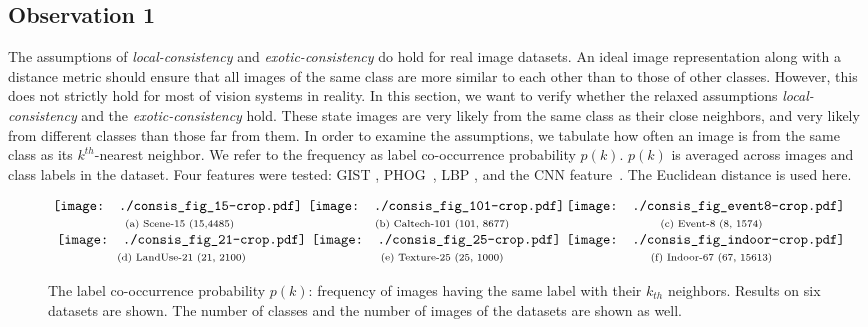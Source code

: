 \documentclass[preprint,12pt,3p]{elsarticle}
\begin{document}
\subsection{Observation 1}
\label{sec:mov1}
The assumptions of \emph{local-consistency} and
\emph{exotic-consist\-ency} do hold for real image datasets.  An
ideal image representation along with a distance metric should ensure
that all images of the same class are more similar to each other
than to those of other classes. However, this does not strictly hold for
most of vision systems in reality. In this section, we want to verify
whether the relaxed assumptions 
\emph{local-consistency} and the \emph{exotic-consistency} hold. 
These state images are very likely from the same class as their close
neighbors, and very likely from different classes than those far from them. 
In order to examine the assumptions, we tabulate how often an
image is from the same class as its $k^{th}$-nearest neighbor.  We
refer to the frequency as label co-occurrence probability $p(k)$.
$p(k)$ is averaged across images and class labels in the dataset. Four
features were tested: GIST \citep{gist}, PHOG~\citep{Bosch:iccv07},
LBP \citep{Ojala02}, and the CNN feature~\citep{deep:bmvc14}. 
The Euclidean distance is used here.

\begin{figure*}[ht]
$ \begin{array}{cccc} \hspace{-2mm}
\texttt{[image: ./consis\_fig\_15-crop.pdf]} & \hspace{-3mm}
\texttt{[image: ./consis\_fig\_101-crop.pdf]} & \hspace{-3mm} 
\texttt{[image: ./consis\_fig\_event8-crop.pdf]} \\ 
\scriptsize{\text{(a) Scene-15 (15,4485) }}  & \scriptsize{\text{(b) Caltech-101 (101, 8677)} }  & \scriptsize{\text{(c) Event-8 (8, 1574)} }  \\

\texttt{[image: ./consis\_fig\_21-crop.pdf]} & \hspace{-3mm}
\texttt{[image: ./consis\_fig\_25-crop.pdf]} & \hspace{-3mm} 
\texttt{[image: ./consis\_fig\_indoor-crop.pdf]} \\ 
\scriptsize{\text{(d) LandUse-21 (21, 2100)} }  & \scriptsize{\text{(e) Texture-25 (25, 1000)} }  & \scriptsize{\text{(f) Indoor-67 (67, 15613)} }  \\
\end{array} $ 
\caption{The label co-occurrence probability $p(k)$: frequency of
  images having the same label with their $k_{th}$ neighbors.  Results
  on six datasets are shown. The number of classes and the number
  of images of the datasets are shown as well. }
\label{fig:mov1}
\end{figure*}
\end{document}

